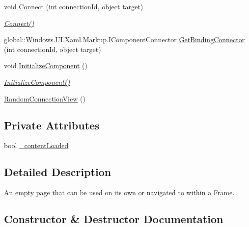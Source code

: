 \begin{DoxyCompactItemize}
void \hyperlink{class_e_l_i_client_1_1_views_1_1_random_connection_view_a566a44c8030e725eb7e895c15471523b}{Connect} (int connection\+Id, object target)
\begin{DoxyCompactList}\small\item\em \hyperlink{class_e_l_i_client_1_1_views_1_1_random_connection_view_a566a44c8030e725eb7e895c15471523b}{Connect()} \end{DoxyCompactList}\item 
global\+::\+Windows.\+U\+I.\+Xaml.\+Markup.\+I\+Component\+Connector \hyperlink{class_e_l_i_client_1_1_views_1_1_random_connection_view_a2638dea21d4a8b188fce66c668730a27}{Get\+Binding\+Connector} (int connection\+Id, object target)
\item 
void \hyperlink{class_e_l_i_client_1_1_views_1_1_random_connection_view_a64aed3e5ad3626eecf77464df5d0f123}{Initialize\+Component} ()
\begin{DoxyCompactList}\small\item\em \hyperlink{class_e_l_i_client_1_1_views_1_1_random_connection_view_a64aed3e5ad3626eecf77464df5d0f123}{Initialize\+Component()} \end{DoxyCompactList}\item 
\hyperlink{class_e_l_i_client_1_1_views_1_1_random_connection_view_a603c6d53bc6eccddb8874815ce4b9bff}{Random\+Connection\+View} ()
\end{DoxyCompactItemize}
\subsection*{Private Attributes}
\begin{DoxyCompactItemize}
\item 
bool \hyperlink{class_e_l_i_client_1_1_views_1_1_random_connection_view_acfb9bf9b0d8a09e90981f453a1a108f3}{\+\_\+content\+Loaded}
\end{DoxyCompactItemize}


\subsection{Detailed Description}
An empty page that can be used on its own or navigated to within a Frame. 



\subsection{Constructor \& Destructor Documentation}
\mbox{\label{class_e_l_i_client_1_1_views_1_1_random_connection_view_a603c6d53bc6eccddb8874815ce4b9bff}} 
